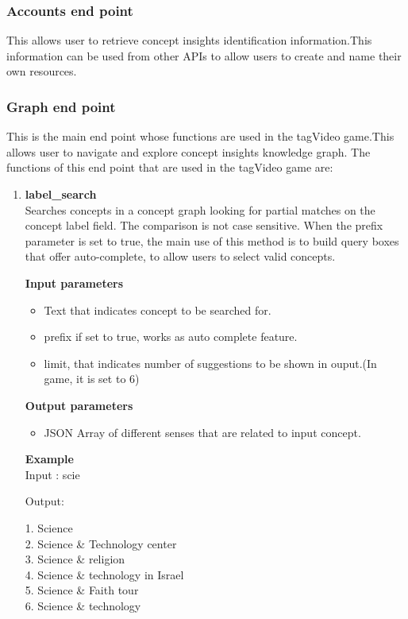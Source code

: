\documentclass[12pt]{article}
\begin{document}
\subsubsection{Accounts end point}
This allows user to retrieve concept insights identification information.This information can be used from other APIs to allow users to create and name their own resources.

\subsubsection{Graph end point}

This is the main end point whose functions are used in the tagVideo game.This allows user to navigate and explore concept insights knowledge graph.
The functions of this end point that are used in the tagVideo game are:
\begin{enumerate}


\item{\textbf{label\_search }}\\
Searches concepts in a concept graph looking for partial matches on the concept label field. The comparison is not case sensitive. When the prefix parameter is set to true, the main use of this method is to build query boxes that offer auto-complete, to allow users to select valid concepts.

\textbf{Input parameters}
\begin{itemize}


\item Text that indicates concept to be searched for. 
\item prefix if set to true, works as auto complete feature.
\item limit, that indicates number of suggestions to be shown in ouput.(In game, it is set to 6)
\end{itemize}
\textbf{Output parameters}
\begin{itemize}


\item JSON Array of different senses that are related to input concept.

    \end{itemize}
    
  \textbf{Example}\\
  
  Input : scie
  
  Output: 
  
  1. Science\\
  2. Science \& Technology center\\
  3. Science \& religion\\
  4. Science \& technology in Israel\\
  5. Science \& Faith tour\\
  6. Science \& technology\\
  

\end{enumerate}
\end{document}
